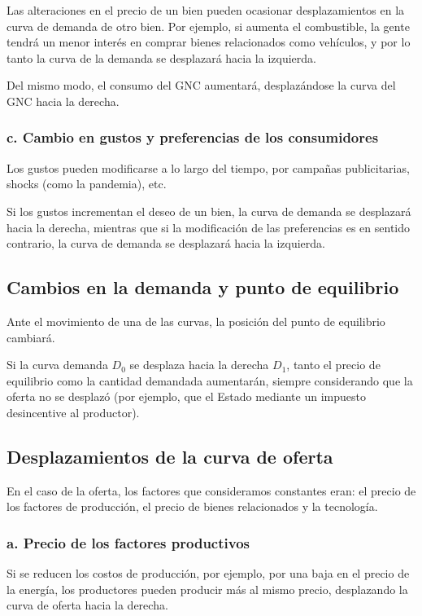 Las alteraciones en el precio de un bien
pueden ocasionar desplazamientos en la curva de demanda de otro bien.
Por ejemplo,
si aumenta el combustible,
la gente tendrá un menor interés
en comprar bienes relacionados como vehículos,
y por lo tanto la curva de la demanda se desplazará hacia la izquierda.

Del mismo modo,
el consumo del GNC aumentará,
desplazándose la curva del GNC hacia la derecha.

\subsubsection{c. Cambio en gustos y preferencias de los consumidores}

Los gustos pueden modificarse a lo largo del tiempo,
por campañas publicitarias,
shocks (como la pandemia),
etc.

Si los gustos incrementan el deseo de un bien,
la curva de demanda se desplazará hacia la derecha,
mientras que si la modificación de las preferencias es en sentido contrario,
la curva de demanda se desplazará hacia la izquierda.

\subsection{Cambios en la demanda y punto de equilibrio}

Ante el movimiento de una de las curvas,
la posición del punto de equilibrio cambiará.

Si la curva demanda \(D_0\) se desplaza hacia la derecha \(D_1\),
tanto el precio de equilibrio como la cantidad demandada aumentarán,
siempre considerando que la oferta no se desplazó
(por ejemplo,
que el Estado mediante un impuesto desincentive al productor).

\subsection{Desplazamientos de la curva de oferta}

En el caso de la oferta,
los factores que consideramos constantes eran:
el precio de los factores de producción,
el precio de bienes relacionados y la tecnología.

\subsubsection{a. Precio de los factores productivos}

Si se reducen los costos de producción,
por ejemplo,
por una baja en el precio de la energía,
los productores pueden producir más al mismo precio,
desplazando la curva de oferta hacia la derecha.

